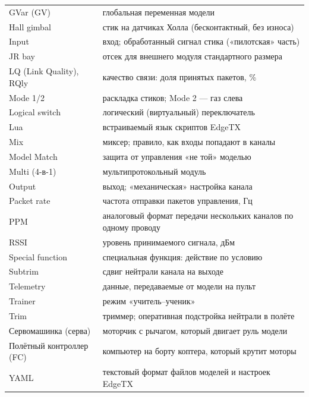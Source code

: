 \begin{small}
\begin{longtable}{@{}L{40mm}L{120mm}@{}}
GVar (GV) & глобальная переменная модели \\
Hall gimbal & стик на датчиках Холла (бесконтактный, без износа) \\
Input & вход; обработанный сигнал стика («пилотская» часть) \\
JR bay & отсек для внешнего модуля стандартного размера \\
LQ (Link Quality), RQly & качество связи: доля принятых пакетов, \% \\
Mode 1/2 & раскладка стиков; Mode 2 --- газ слева \\
Logical switch & логический (виртуальный) переключатель \\
Lua & встраиваемый язык скриптов EdgeTX \\
Mix & миксер; правило, как входы попадают в каналы \\
Model Match & защита от управления «не той» моделью \\
Multi (4-в-1) & мультипротокольный модуль \\
Output & выход; «механическая» настройка канала \\
Packet rate & частота отправки пакетов управления, Гц \\
PPM & аналоговый формат передачи нескольких каналов по одному проводу \\
RSSI & уровень принимаемого сигнала, дБм \\
Special function & специальная функция: действие по условию \\
Subtrim & сдвиг нейтрали канала на выходе \\
Telemetry & данные, передаваемые от модели на пульт \\
Trainer & режим «учитель--ученик» \\
Trim & триммер; оперативная подстройка нейтрали в полёте \\
Сервомашинка (серва) & моторчик с рычагом, который двигает руль модели \\
Полётный контроллер (FC) & компьютер на борту коптера, который крутит моторы \\
YAML & текстовый формат файлов моделей и настроек EdgeTX \\
\bottomrule
\end{longtable}
\end{small}

